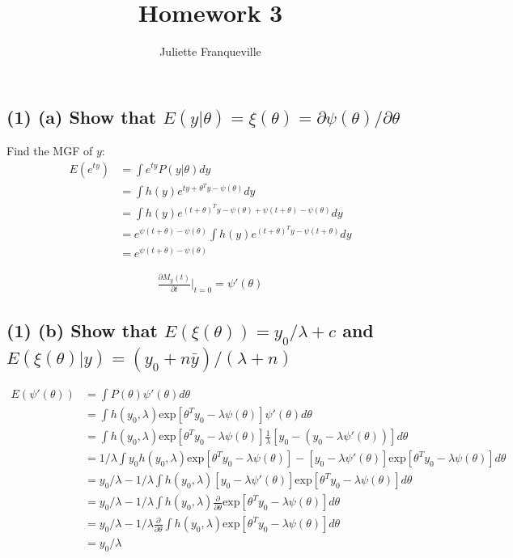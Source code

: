 \documentclass[11pt]{article}
\begin{document}
 
\title{Homework 3}
\author{Juliette Franqueville\\
}
\maketitle

\subsection*{(1) (a) Show that $E(y | \theta) = 
\xi(\theta)= \partial \psi(\theta) / \partial \theta$}

Find the MGF of $y$:
\begin{align*}
    E(e^{ty}) &= \int e^{ty}P(y|\theta)dy\\
    &=  \int h(y)e^{ty+\theta^Ty-\psi(\theta)}dy\\
     &=  \int h(y)e^{(t+\theta)^Ty -\psi(\theta) + \psi(t+\theta) -\psi(\theta)}dy\\
     &=  e^{\psi(t+\theta) -\psi(\theta)}\int h(y)e^{(t+\theta)^Ty -\psi(t+\theta)}dy\\
     &= e^{\psi(t+\theta) -\psi(\theta)}
\end{align*}

\begin{align*}
   \frac{\partial M_y(t)}{\partial t}\rvert_{t=0} = \psi'(\theta)
\end{align*}

\subsection*{(1) (b) Show that $E(\xi(\theta)) = y_0 / \lambda + c$
and $E(\xi(\theta)|y) = (y_0 + n\bar{y})/(\lambda + n)$}

\begin{align*}
    E(\psi'(\theta)) &= \int P(\theta)\psi'(\theta)d\theta\\
    &= \int h(y_0, \lambda)\text{exp}[\theta^Ty_0-\lambda \psi(\theta)]\psi'(\theta)d\theta\\
     &= \int h(y_0, \lambda)\text{exp}[\theta^Ty_0-\lambda \psi(\theta)]\frac{1}{\lambda}[y_0 - (y_0-\lambda\psi'(\theta))]d\theta\\
     &= 1/\lambda \int y_0 h(y_0, \lambda)\text{exp}[\theta^Ty_0-\lambda \psi(\theta)] - [y_0-\lambda\psi'(\theta)]\text{exp}[\theta^Ty_0-\lambda  \psi(\theta)] d\theta\\
     &= y_0/\lambda - 1/\lambda \int  h(y_0, \lambda) [y_0-\lambda\psi'(\theta)]\text{exp}[\theta^Ty_0-\lambda  \psi(\theta)] d\theta\\
     &= y_0/\lambda - 1/\lambda \int  h(y_0, \lambda) \frac{\partial}{\partial \theta}\text{exp}[\theta^Ty_0-\lambda  \psi(\theta)] d\theta\\
      &= y_0/\lambda - 1/\lambda \frac{\partial}{\partial \theta} \int  h(y_0, \lambda) \text{exp}[\theta^Ty_0-\lambda  \psi(\theta)] d\theta\\
      &= y_0/\lambda 
\end{align*}
\end{document}
